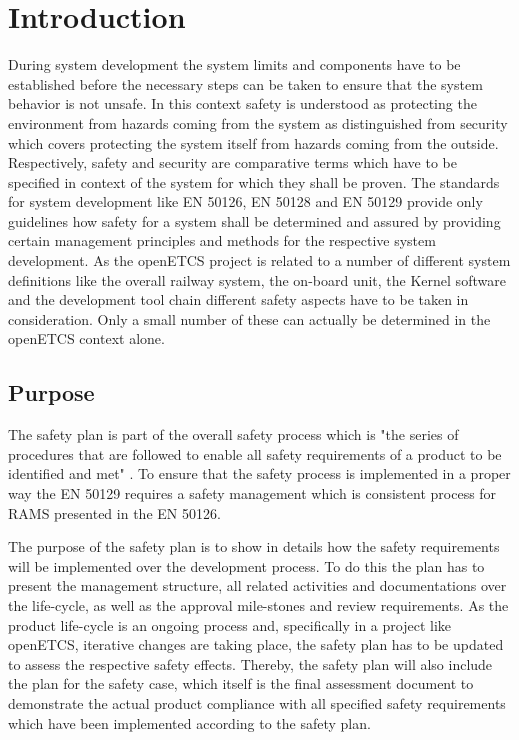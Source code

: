 \documentclass{template/openetcs_report}
\begin{document}
\chapter{Introduction}
\label{sec:introduction}

During system development the system limits and components have to be established before the necessary steps can be taken to ensure that the system behavior is not unsafe. In this context safety is understood as protecting the environment from hazards coming from the system as distinguished from security which covers protecting the system itself from hazards coming from the outside. Respectively, safety and security are comparative terms which have to be specified in context of the system for which they shall be proven. The standards for system development like EN 50126, EN 50128 and EN 50129 provide only guidelines how safety for a system shall be determined and assured by providing certain management principles and methods for the respective system development. As the openETCS project is related to a number of different system definitions like the overall railway system, the on-board unit, the Kernel software and the development tool chain different safety aspects have to be taken in consideration. Only a small number of these can actually be determined in the openETCS context alone.

\section{Purpose}
\label{sec:purpose}

The safety plan is part of the overall safety process which is "the series of procedures that are followed to enable all safety requirements of a product to be identified and met" \cite{EN50129}. To ensure that the safety process is implemented in a proper way the EN 50129 requires a safety management which is consistent process for RAMS presented in the EN 50126. 

The purpose of the safety plan is to show in details how the safety requirements will be implemented over the development process. To do this the plan has to present the management structure, all related activities and documentations over the life-cycle, as well as the approval mile-stones and review requirements. As the product life-cycle is an ongoing process and, specifically in a project like openETCS, iterative changes are taking place, the safety plan has to be updated to assess the respective safety effects. Thereby, the safety plan will also include the plan for the safety case, which itself is the final assessment document to demonstrate the actual product compliance with all specified safety requirements which have been implemented according to the safety plan.
\end{document}
